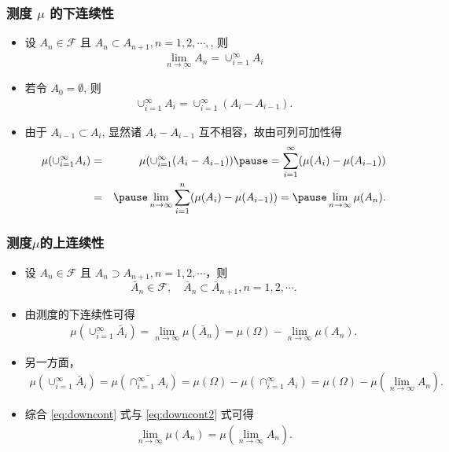 \documentclass[Prob-All.tex]{subfiles}
\begin{document}
\begin{frame}%
	\frametitle{测度 $\mu$ 的下连续性}
	\begin{itemize}[<+-|alert@+>]
	\item 设 $A_n\in\mathcal{F}$ 且 $A_n\subset A_{n+1}, n=1,2,\cdots,$, 则
	\begin{eqnarray*}
		\lim_{n\rightarrow \infty}A_n=\cup_{i=1}^\infty A_i
	\end{eqnarray*}
	\item  若令 $A_0=\emptyset$, 则
	\begin{eqnarray*}
		\cup_{i=1}^\infty A_i=\cup_{i=1}^\infty (A_i-A_{i-1}).
	\end{eqnarray*}
	\item   由于 $A_{i-1}\subset A_i$, 显然诸 $A_i-A_{i-1}$ 互不相容，故由可列可加性得
	\begin{eqnarray*}
		\mu(\cup_{i=1}^\infty A_i)&=&\mu(\cup_{i=1}^\infty (A_i-A_{i-1}))\pause =\sum_{i=1}^\infty (\mu(A_i)-\mu(A_{i-1}))\\
		&=&\pause \lim_{n\rightarrow \infty}\sum_{i=1}^n(\mu(A_i)-\mu(A_{i-1}))=\pause \lim_{n\rightarrow \infty}\mu(A_n).
	\end{eqnarray*}
	\end{itemize}



\end{frame}
\begin{frame}
	\frametitle{测度$\mu$的上连续性}
	\begin{itemize}[<+-|alert@+>]
	\item 设 $A_n\in\mathcal{F}$ 且 $A_n\supset A_{n+1}, n=1,2,\cdots$，则
	$$\bar{A}_n\in\mathcal{F}, \quad  \bar{A}_n\subset \bar{A}_{n+1}, n=1, 2, \cdots.$$
	\item 由测度的下连续性可得
	\begin{eqnarray}\label{eq:downcont}
		\mu(\cup_{i=1}^\infty \bar{A}_i)=\lim_{n\rightarrow\infty}\mu(\bar{A}_n)=\mu(\Omega)-\lim_{n\rightarrow\infty}\mu(A_n).
	\end{eqnarray}
	\item 另一方面，
	\begin{eqnarray}
		\label{eq:downcont2}
		\mu(\cup_{i=1}^\infty \bar{A}_i)=\mu(\overline{\cap_{i=1}^\infty A_i})=\mu(\Omega)-\mu(\cap_{i=1}^\infty A_i)=\mu(\Omega)-\mu(\lim_{n\rightarrow\infty}A_n).
	\end{eqnarray}
	\item 综合 \eqref{eq:downcont} 式与 \eqref{eq:downcont2} 式可得
	\begin{eqnarray*}
		\lim_{n\rightarrow\infty}\mu(A_n)=\mu(\lim_{n\rightarrow\infty}A_n).
	\end{eqnarray*}
	\end{itemize}



\end{frame}
\end{document}
